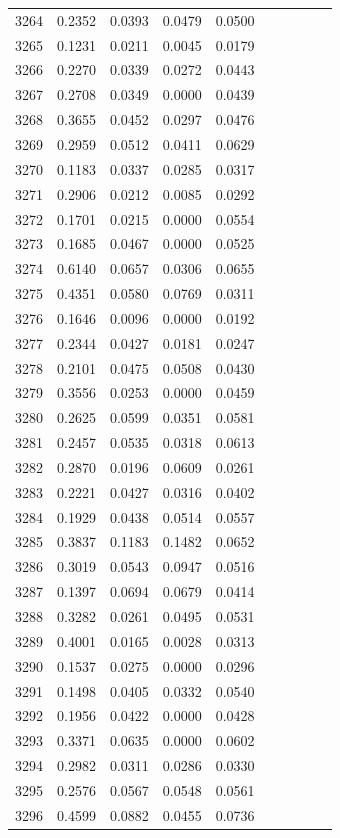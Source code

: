 \begin{table}
\begin{tabular}{cccccccccc}
3264& 0.2352& 0.0393& 0.0479& 0.0500\\ 
3265& 0.1231& 0.0211& 0.0045& 0.0179\\ 
3266& 0.2270& 0.0339& 0.0272& 0.0443\\ 
3267& 0.2708& 0.0349& 0.0000& 0.0439\\ 
3268& 0.3655& 0.0452& 0.0297& 0.0476\\ 
3269& 0.2959& 0.0512& 0.0411& 0.0629\\ 
3270& 0.1183& 0.0337& 0.0285& 0.0317\\ 
3271& 0.2906& 0.0212& 0.0085& 0.0292\\ 
3272& 0.1701& 0.0215& 0.0000& 0.0554\\ 
3273& 0.1685& 0.0467& 0.0000& 0.0525\\ 
3274& 0.6140& 0.0657& 0.0306& 0.0655\\ 
3275& 0.4351& 0.0580& 0.0769& 0.0311\\ 
3276& 0.1646& 0.0096& 0.0000& 0.0192\\ 
3277& 0.2344& 0.0427& 0.0181& 0.0247\\ 
3278& 0.2101& 0.0475& 0.0508& 0.0430\\ 
3279& 0.3556& 0.0253& 0.0000& 0.0459\\ 
3280& 0.2625& 0.0599& 0.0351& 0.0581\\ 
3281& 0.2457& 0.0535& 0.0318& 0.0613\\ 
3282& 0.2870& 0.0196& 0.0609& 0.0261\\ 
3283& 0.2221& 0.0427& 0.0316& 0.0402\\ 
3284& 0.1929& 0.0438& 0.0514& 0.0557\\ 
3285& 0.3837& 0.1183& 0.1482& 0.0652\\ 
3286& 0.3019& 0.0543& 0.0947& 0.0516\\ 
3287& 0.1397& 0.0694& 0.0679& 0.0414\\ 
3288& 0.3282& 0.0261& 0.0495& 0.0531\\ 
3289& 0.4001& 0.0165& 0.0028& 0.0313\\ 
3290& 0.1537& 0.0275& 0.0000& 0.0296\\ 
3291& 0.1498& 0.0405& 0.0332& 0.0540\\ 
3292& 0.1956& 0.0422& 0.0000& 0.0428\\ 
3293& 0.3371& 0.0635& 0.0000& 0.0602\\ 
3294& 0.2982& 0.0311& 0.0286& 0.0330\\ 
3295& 0.2576& 0.0567& 0.0548& 0.0561\\ 
3296& 0.4599& 0.0882& 0.0455& 0.0736\\ 

\end{tabular}
\end{table}

